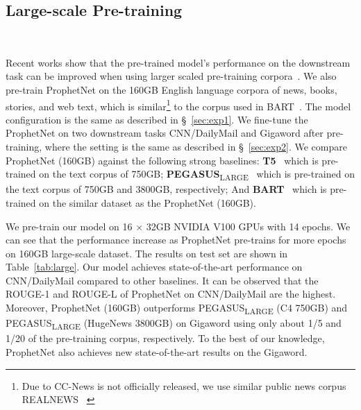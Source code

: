 \documentclass[11pt,a4paper]{article}
\begin{document}
\subsection{Large-scale Pre-training}~\label{sec:exp4}







Recent works show that the pre-trained model's performance on the downstream task can be improved when using larger scaled pre-training corpora~\cite{lewis2019bart, raffel2019exploring}. 
We also pre-train ProphetNet on the 160GB English language corpora of news, books, stories, and web text, which is similar\footnote{Due to CC-News is not officially released, we use similar public news corpus REALNEWS ~\cite{zellers2019defending}} to the corpus used in BART~\cite{lewis2019bart}.
The model configuration is the same as described in \S~\ref{sec:exp1}.
We fine-tune the ProphetNet on two downstream tasks CNN/DailyMail and Gigaword after pre-training, where the setting is the same as described in \S~\ref{sec:exp2}. 
We compare ProphetNet (160GB) against the following strong baselines: \textbf{T5}~\cite{raffel2019exploring} which is pre-trained on the text corpus of 750GB; \textbf{PEGASUS}\textsubscript{LARGE}~\cite{zhang2019pegasus} which is pre-trained on the text corpus of 750GB and 3800GB, respectively; And \textbf{BART}~\cite{lewis2019bart} which is pre-trained on the similar dataset as the ProphetNet (160GB).

We pre-train our model on 16 $\times$ 32GB NVIDIA V100 GPUs with 14 epochs.  We can see that the performance increase as ProphetNet pre-trains for more epochs on 160GB large-scale dataset.  The results on test set are shown in Table~\ref{tab:large}.   
Our model achieves state-of-the-art performance on CNN/DailyMail compared to other baselines.
It can be observed that the ROUGE-1 and ROUGE-L of ProphetNet on CNN/DailyMail are the highest.
Moreover, ProphetNet (160GB) outperforms PEGASUS\textsubscript{LARGE} (C4 750GB) and PEGASUS\textsubscript{LARGE} (HugeNews 3800GB) on Gigaword using only about 1/5 and 1/20 of the pre-training corpus, respectively. To the best of our knowledge, ProphetNet also achieves new state-of-the-art results on the Gigaword. 
\end{document}
